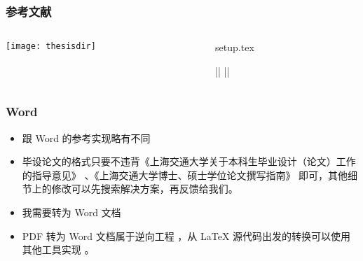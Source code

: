 \begin{frame}[fragile]
  \frametitle{参考文献}
  \begin{columns}
    \begin{column}{0.4\textwidth}
      \texttt{[image: thesisdir]}
    \end{column}
    \begin{column}{0.6\textwidth}
      \begin{codeblock}[firstnumber=111,numbersep=2pt]{setup.tex}
\usepackage[backend=biber,style=gb7714-2015]{biblatex}
\setlength{\bibitemsep}{0pt}
|\highlightline|%
|\highlightline|
      \end{codeblock}
    \end{column}
  \end{columns}
\end{frame}

\begin{frame}
  \frametitle{Word}
  \begin{itemize}
    \item[{\faQuestionCircle[regular]}] 跟 Word 的参考实现略有不同 
    \item[{\faCheckCircle[regular]}] 毕设论文的格式只要不违背《上海交通大学关于本科生毕业设计（论文）工作的指导意见》 、《上海交通大学博士、硕士学位论文撰写指南》  即可，其他细节上的修改可以先搜索解决方案，再反馈给我们。
    \item[{\faQuestionCircle[regular]}] 我需要转为 Word 文档
    \item[{\faCheckCircle[regular]}] PDF 转为 Word 文档属于逆向工程 ，从 \LaTeX{} 源代码出发的转换可以使用其他工具实现  。
  \end{itemize}
\end{frame}

